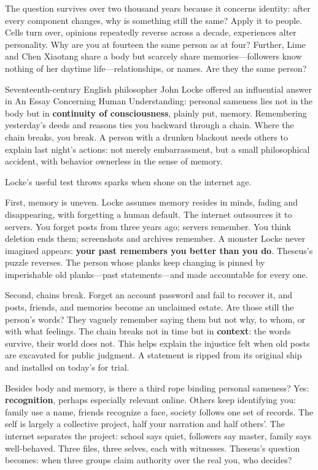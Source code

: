 The question survives over two thousand years because it concerns identity: after every component changes, why is something still the same? Apply it to people. Cells turn over, opinions repeatedly reverse across a decade, experiences alter personality. Why are you at fourteen the same person as at four? Further, Lime and Chen Xiaotang share a body but scarcely share memories---followers know nothing of her daytime life---relationships, or names. Are they the same person?

Seventeenth-century English philosopher John Locke offered an influential answer in An Essay Concerning Human Understanding: personal sameness lies not in the body but in \textbf{continuity of consciousness}, plainly put, memory. Remembering yesterday's deeds and reasons ties you backward through a chain. Where the chain breaks, you break. A person with a drunken blackout needs others to explain last night's actions: not merely embarrassment, but a small philosophical accident, with behavior ownerless in the sense of memory.

Locke's useful test throws sparks when shone on the internet age.

First, memory is uneven. Locke assumes memory resides in minds, fading and disappearing, with forgetting a human default. The internet outsources it to servers. You forget posts from three years ago; servers remember. You think deletion ends them; screenshots and archives remember. A monster Locke never imagined appears: \textbf{your past remembers you better than you do}. Theseus's puzzle reverses. The person whose planks keep changing is pinned by imperishable old planks---past statements---and made accountable for every one.

Second, chains break. Forget an account password and fail to recover it, and posts, friends, and memories become an unclaimed estate. Are those still the person's words? They vaguely remember saying them but not why, to whom, or with what feelings. The chain breaks not in time but in \textbf{context}: the words survive, their world does not. This helps explain the injustice felt when old posts are excavated for public judgment. A statement is ripped from its original ship and installed on today's for trial.

Besides body and memory, is there a third rope binding personal sameness? Yes: \textbf{recognition}, perhaps especially relevant online. Others keep identifying you: family use a name, friends recognize a face, society follows one set of records. The self is largely a collective project, half your narration and half others'. The internet separates the project: school says quiet, followers say master, family says well-behaved. Three files, three selves, each with witnesses. Theseus's question becomes: when three groups claim authority over the real you, who decides?

